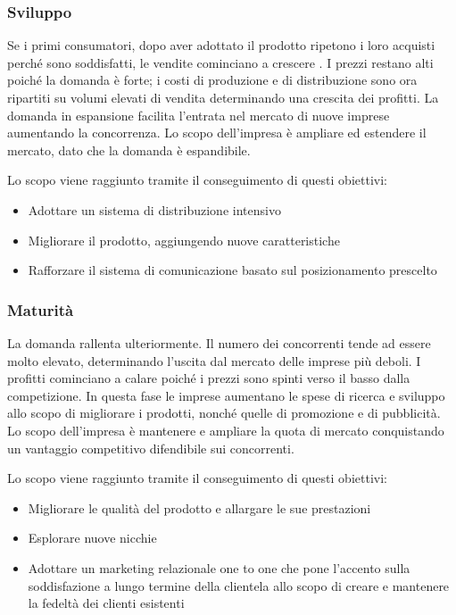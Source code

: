 \subsubsection{Sviluppo}
Se i primi consumatori, dopo aver adottato il prodotto ripetono i loro acquisti perché sono soddisfatti, le vendite cominciano a crescere . I prezzi restano alti poiché la domanda
è forte; i costi di produzione e di distribuzione sono ora ripartiti su volumi elevati di vendita determinando una crescita dei profitti. La domanda in espansione facilita l’entrata nel mercato di nuove imprese aumentando la concorrenza. 
Lo scopo dell’impresa è ampliare ed estendere il mercato, dato che la domanda è espandibile.

Lo scopo viene raggiunto tramite il conseguimento di questi obiettivi:
\begin{itemize}
	\item Adottare un sistema di distribuzione intensivo
	\item Migliorare il prodotto, aggiungendo nuove caratteristiche
	\item Rafforzare il sistema di comunicazione basato sul posizionamento prescelto
\end{itemize}

\subsubsection{Maturità}
La domanda rallenta ulteriormente. Il numero dei concorrenti tende ad essere molto elevato, determinando l’uscita dal mercato delle imprese più deboli. I profitti cominciano a
calare poiché i prezzi sono spinti verso il basso dalla competizione. In questa fase le imprese aumentano le spese di ricerca e sviluppo allo scopo di migliorare i prodotti, nonché quelle di promozione e di pubblicità.
Lo scopo dell’impresa è mantenere e ampliare la quota di mercato conquistando un vantaggio competitivo difendibile sui concorrenti.

Lo scopo viene raggiunto tramite il conseguimento di questi obiettivi:
\begin{itemize}
	\item Migliorare le qualità del prodotto e allargare le sue prestazioni
	\item Esplorare nuove nicchie
	\item Adottare un marketing relazionale one to one che pone l’accento sulla soddisfazione a lungo termine della clientela allo scopo di creare e mantenere la fedeltà dei clienti esistenti
\end{itemize}

